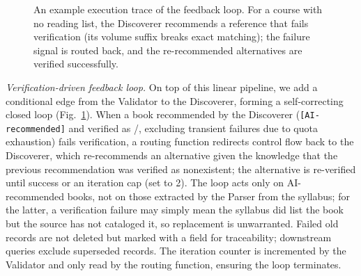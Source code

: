 \documentclass[conference]{IEEEtran}
\begin{document}
\begin{figure}[t]
\centering
{}
\caption{An example execution trace of the feedback loop. For a course with no
reading list, the Discoverer recommends a reference that fails verification (its
volume suffix breaks exact matching); the failure signal is routed back, and the
re-recommended alternatives are verified successfully.}
\label{fig:trace}
\end{figure}

\textit{Verification-driven feedback loop.} On top of this linear pipeline, we
add a conditional edge from the Validator to the Discoverer, forming a
self-correcting closed loop (Fig.~\ref{fig:trace}). When a book recommended by
the Discoverer (\texttt{[AI-recommended]} and verified as
\texttt{}/\texttt{}, excluding
transient failures due to quota exhaustion) fails
verification, a routing function redirects control flow back to the Discoverer,
which re-recommends an alternative given the knowledge that the previous
recommendation was verified as nonexistent; the alternative is re-verified
until success or an iteration cap (set to 2). The loop acts only on
AI-recommended books, not on those extracted by the Parser from the
syllabus; for the latter, a verification failure may simply mean the syllabus
did list the book but the source has not cataloged it, so replacement is
unwarranted. Failed old records are not deleted but marked with a
\texttt{} field for traceability; downstream queries
exclude superseded records. The iteration counter is incremented by the
Validator and only read by the routing function, ensuring the loop terminates.
\end{document}
